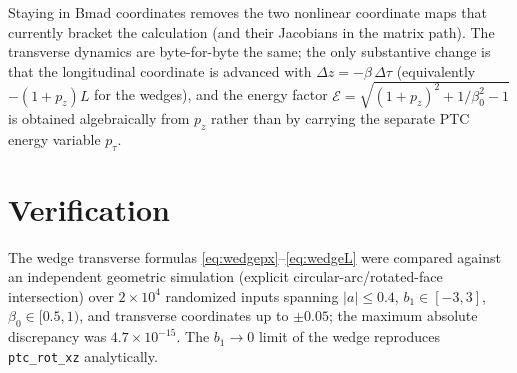\documentclass[11pt]{article}
\newcommand{\code}[1]{\texttt{#1}}
\newcommand{\ptcE}{\mathcal{E}}          %
\begin{document}
Staying in Bmad coordinates removes the two nonlinear coordinate maps that
currently bracket the calculation (and their Jacobians in the matrix path).
The transverse dynamics are byte-for-byte the same; the only substantive change
is that the longitudinal coordinate is advanced with $\Delta z = -\beta\,
\Delta\tau$ (equivalently $-(1+p_z)L$ for the wedges), and the energy factor
$\ptcE = \sqrt{(1+p_z)^2 + 1/\beta_0^2 - 1}$ is obtained algebraically from
$p_z$ rather than by carrying the separate PTC energy variable $p_\tau$.

\section*{Verification}

The wedge transverse formulas
\eqref{eq:wedgepx}--\eqref{eq:wedgeL} were compared against an independent
geometric simulation (explicit circular-arc/rotated-face intersection) over
$2\times10^4$ randomized inputs spanning
$|a|\le0.4$, $b_1\in[-3,3]$, $\beta_0\in[0.5,1)$, and transverse coordinates up
to $\pm0.05$; the maximum absolute discrepancy was $4.7\times10^{-15}$. The
$b_1\to0$ limit of the wedge reproduces \code{ptc\_rot\_xz} analytically.
\end{document}
